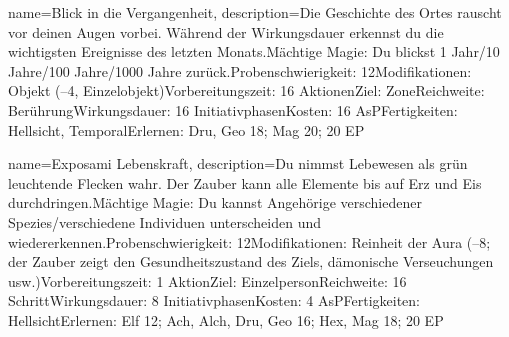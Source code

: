 {
    name={Blick in die Vergangenheit},
    description={Die Geschichte des Ortes rauscht vor deinen Augen vorbei. Während der Wirkungsdauer erkennst du die wichtigsten Ereignisse des letzten Monats.\newline Mächtige Magie: Du blickst 1 Jahr/10 Jahre/100 Jahre/1000 Jahre zurück.\newline Probenschwierigkeit: 12\newline Modifikationen: Objekt (–4, Einzelobjekt)\newline Vorbereitungszeit: 16 Aktionen\newline Ziel: Zone\newline Reichweite: Berührung\newline Wirkungsdauer: 16 Initiativphasen\newline Kosten: 16 AsP\newline Fertigkeiten: Hellsicht, Temporal\newline Erlernen: Dru, Geo 18; Mag 20; 20 EP}
}


{
    name={Exposami Lebenskraft},
    description={Du nimmst Lebewesen als grün leuchtende Flecken wahr. Der Zauber kann alle Elemente bis auf Erz und Eis durchdringen.\newline Mächtige Magie: Du kannst Angehörige verschiedener Spezies/verschiedene Individuen unterscheiden und wiedererkennen.\newline Probenschwierigkeit: 12\newline Modifikationen: Reinheit der Aura (–8; der Zauber zeigt den Gesundheitszustand des Ziels, dämonische Verseuchungen usw.)\newline Vorbereitungszeit: 1 Aktion\newline Ziel: Einzelperson\newline Reichweite: 16 Schritt\newline Wirkungsdauer: 8 Initiativphasen\newline Kosten: 4 AsP\newline Fertigkeiten: Hellsicht\newline Erlernen: Elf 12; Ach, Alch, Dru, Geo 16; Hex, Mag 18; 20 EP}
}


